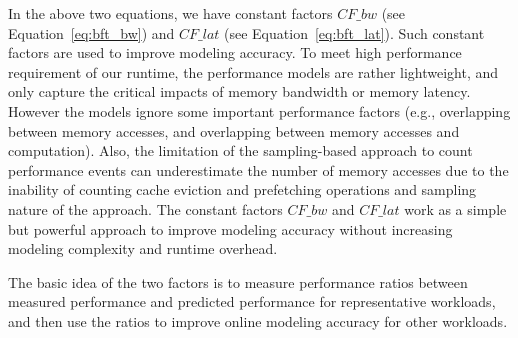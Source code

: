 In the above two equations, we have constant factors $CF\_bw$ (see Equation~\ref{eq:bft_bw}) and $CF\_lat$ (see Equation~\ref{eq:bft_lat}).
Such constant factors are used to improve modeling accuracy.
To meet high performance requirement of our runtime,
the performance models are rather lightweight, and only capture the critical impacts of memory bandwidth or memory latency.
However the models ignore some important performance factors (e.g., overlapping between memory accesses, and overlapping between memory accesses and computation).
Also, the limitation of the sampling-based approach to
count performance events can underestimate the number of memory accesses due to the inability of counting cache eviction and prefetching operations and sampling nature of the approach.
The constant factors $CF\_bw$ and $CF\_lat$ work as a simple but powerful approach to improve modeling accuracy without increasing modeling complexity and runtime overhead.

The basic idea of the two factors is to measure performance ratios between measured performance and predicted performance for representative workloads, and then use the ratios to improve online modeling accuracy for other workloads.

\begin{comment}
In particular, the constant factor $CF\_bw$ is obtained offline. Since Equation~\ref{eq:bft_bw} 
targets on the data object that is sensitive to memory bandwidth,
we run the benchmark STREAM to obtain $CF\_bw$.
In particular, we calculate the performance ratio
between the predicted performance and measured performance 
when running the benchmark in DRAM.
Such performance ratio is $CF\_bw$. The predicted performance is calculated based on ($\#data\_access \times cacheline\_size/DRAM\_bw$), where $\#data\_access$ is collected with performance counters using the sampling-based approach.
Hence, $CF\_bw$ accounts for the potential performance difference between the sampling-based approach and real performance.
\end{comment}

